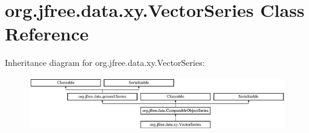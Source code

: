\hypertarget{classorg_1_1jfree_1_1data_1_1xy_1_1_vector_series}{}\section{org.\+jfree.\+data.\+xy.\+Vector\+Series Class Reference}
\label{classorg_1_1jfree_1_1data_1_1xy_1_1_vector_series}
Inheritance diagram for org.\+jfree.\+data.\+xy.\+Vector\+Series\+:\begin{figure}[H]
\begin{center}
\leavevmode
\includegraphics[height=2.314049cm]{classorg_1_1jfree_1_1data_1_1xy_1_1_vector_series}
\end{center}
\end{figure}

